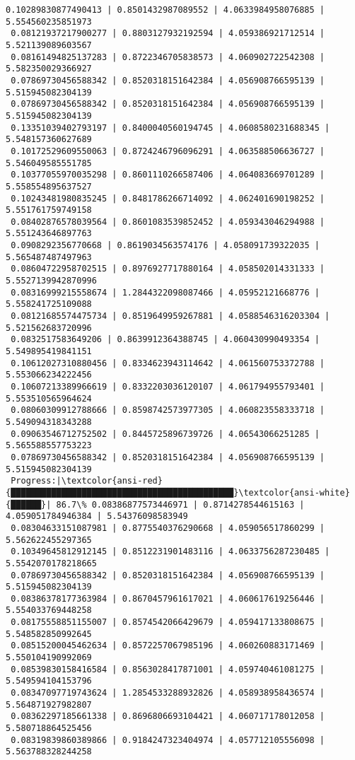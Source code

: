\documentclass[11pt]{article}
\begin{document}
\begin{Verbatim}[commandchars=\\\{\}]
 0.10289830877490413 | 0.8501432987089552 | 4.0633984958076885 | 5.554560235851973
 0.08121937217900277 | 0.8803127932192594 | 4.059386921712514 | 5.521139089603567
 0.08161494825137283 | 0.8722346705838573 | 4.060902722542308 | 5.582350029366927
 0.07869730456588342 | 0.8520318151642384 | 4.056908766595139 | 5.515945082304139
 0.07869730456588342 | 0.8520318151642384 | 4.056908766595139 | 5.515945082304139
 0.13351039402793197 | 0.8400040560194745 | 4.0608580231688345 | 5.548157360627689
 0.10172529609550063 | 0.8724246796096291 | 4.063588506636727 | 5.546049585551785
 0.10377055970035298 | 0.8601110266587406 | 4.064083669701289 | 5.558554895637527
 0.10243481980835245 | 0.8481786266714092 | 4.062401690198252 | 5.551761759749158
 0.08402876578039564 | 0.8601083539852452 | 4.059343046294988 | 5.551243646897763
 0.0908292356770668 | 0.8619034563574176 | 4.058091739322035 | 5.565487487497963
 0.08604722958702515 | 0.8976927717880164 | 4.058502014331333 | 5.5527139942870996
 0.08316999215558674 | 1.2844322098087466 | 4.05952121668776 | 5.558241725109088
 0.08121685574475734 | 0.8519649959267881 | 4.0588546316203304 | 5.521562683720996
 0.0832517583649206 | 0.8639912364388745 | 4.060430990493354 | 5.549895419841151
 0.10612027310880456 | 0.8334623943114642 | 4.061560753372788 | 5.553066234222456
 0.10607213389966619 | 0.8332203036120107 | 4.061794955793401 | 5.553510565964624
 0.08060309912788666 | 0.8598742573977305 | 4.060823558333718 | 5.549094318343288
 0.09063546712752502 | 0.8445725896739726 | 4.06543066251285 | 5.565588557753223
 0.07869730456588342 | 0.8520318151642384 | 4.056908766595139 | 5.515945082304139
 Progress:|\textcolor{ansi-red}{████████████████████████████████████████████}\textcolor{ansi-white}{██████}| 86.7\% 0.08386877573446971 | 0.8714278544615163 | 4.059051784946384 | 5.54376098583949
 0.08304633151087981 | 0.8775540376290668 | 4.059056517860299 | 5.562622455297365
 0.10349645812912145 | 0.8512231901483116 | 4.0633756287230485 | 5.5542070178218665
 0.07869730456588342 | 0.8520318151642384 | 4.056908766595139 | 5.515945082304139
 0.08386378177363984 | 0.8670457961617021 | 4.060617619256446 | 5.554033769448258
 0.08175558851155007 | 0.8574542066429679 | 4.059417133808675 | 5.548582850992645
 0.08515200045462634 | 0.8572257067985196 | 4.060260883171469 | 5.550104190992069
 0.08539830158416584 | 0.8563028417871001 | 4.059740461081275 | 5.549594104153796
 0.08347097719743624 | 1.2854533288932826 | 4.058938958436574 | 5.564871927982807
 0.08362297185661338 | 0.8696806693104421 | 4.060717178012058 | 5.580718864525456
 0.08319839860389866 | 0.9184247323404974 | 4.057712105556098 | 5.563788328244258

\end{Verbatim}
\end{document}
